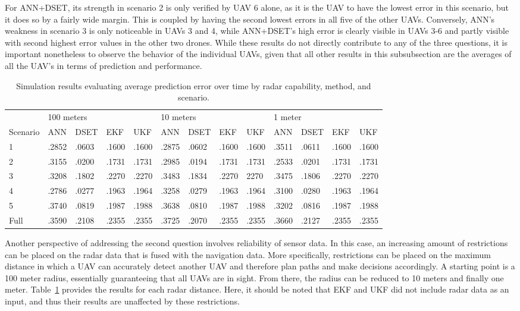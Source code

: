 \documentclass[12pt]{uthesis-v12}  %
\begin{document}
For ANN+DSET, its strength in scenario 2 is only verified by UAV 6 alone, as it is the UAV to have the lowest error in this scenario, but it does so by a fairly wide margin. This is coupled by having the second lowest errors in all five of the other UAVs. Conversely, ANN's weakness in scenario 3 is only noticeable in UAVs 3 and 4, while ANN+DSET's high error is clearly visible in UAVs 3-6 and partly visible with second highest error values in the other two drones. While these results do not directly contribute to any of the three questions, it is important nonetheless to observe the behavior of the individual UAVs, given that all other results in this subsubsection are the averages of all the UAV's in terms of prediction and performance.

\begin{table}[!t]
\caption{Simulation results evaluating average prediction error over time by radar capability, method, and scenario.}
\renewcommand{\arraystretch}{1.3}
\centering
\resizebox{\textwidth}{!}
{\begin{tabular}{*{13}{l}}
\toprule
& \multicolumn{4}{l}{100 meters} & \multicolumn{4}{l}{10 meters} & \multicolumn{4}{l}{1 meter} \\
Scenario & ANN & DSET & EKF & UKF & ANN & DSET & EKF & UKF & ANN & DSET & EKF & UKF \\ \midrule
1 & .2852 & .0603 & .1600 & .1600 & .2875 & .0602 & .1600 & .1600 & .3511 & .0611 & .1600 & .1600 \\
2 & .3155 & .0200 & .1731 & .1731 & .2985 & .0194 & .1731 & .1731 & .2533 & .0201 & .1731 & .1731 \\
3 & .3208 & .1802 & .2270 & .2270 & .3483 & .1834 & .2270 & 2270 & .3475 & .1806 & .2270 & .2270 \\
4 & .2786 & .0277 & .1963 & .1964 & .3258 & .0279 & .1963 & .1964 & .3100 & .0280 & .1963 & .1964  \\
5 & .3740 & .0819 & .1987 & .1988 & .3638 & .0810 & .1987 & .1988 & .3202 & .0816 & .1987 & .1988 \\
Full & .3590 & .2108 & .2355 & .2355 & .3725 & .2070 & .2355 & .2355 & .3660 & .2127 & .2355 & .2355 \\ \bottomrule
\end{tabular}}

\label{radar-single}
\end{table}

Another perspective of addressing the second question involves reliability of sensor data. In this case, an increasing amount of restrictions can be placed on the radar data that is fused with the navigation data. More specifically, restrictions can be placed on the maximum distance in which a UAV can accurately detect another UAV and therefore plan paths and make decisions accordingly. A starting point is a 100 meter radius, essentially guaranteeing that all UAVs are in sight. From there, the radius can be reduced to 10 meters and finally one meter. Table~\ref{radar-single} provides the results for each radar distance. Here, it should be noted that EKF and UKF did not include radar data as an input, and thus their results are unaffected by these restrictions.
\end{document}
